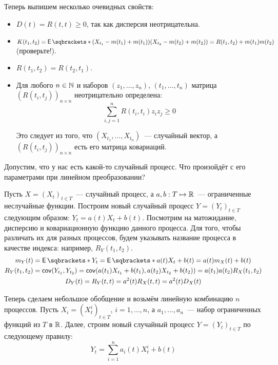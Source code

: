 Теперь выпишем несколько очевидных свойств:
\begin{itemize}
	\item \(D(t) = R(t, t) \geq 0\), так как дисперсия неотрицательна.
	\item \(K(t_{1}, t_{2}) = \E{(X_{t_{1}} - m(t_{1}) + m(t_{1}))(X_{t_{2}} - 
		m(t_{2}) + m(t_{2}))}  = R(t_{1}, t_{2}) + m(t_{1})m(t_{2})\) 
		(проверьте!).
	\item \(R(t_{1}, t_{2}) = R(t_{2}, t_{1})\).
	\item Для любого \(n \in \mathbb{N}\) и наборов \((z_{1}, \ldots, z_{n})\), 
	\((t_{1}, \dots, t_{n})\) матрица \((R(t_{i}, t_{j}))_{n \times n}\) 
	неотрицательно определена:
	\[
	\sum_{i, j = 1}^{n} R(t_{i}, t_{i})z_{i}z_{j} \geq 0
	\]
	
	Это следует из того, что \((X_{t_{1}}, \dots, X_{t_{n}})\)~--- случайный 
	вектор, а \((R(t_{i}, t_{j}))_{n \times n}\) есть его матрица ковариаций.
\end{itemize}

Допустим, что у нас есть какой-то случайный процесс. Что произойдёт с его 
параметрами при линейном преобразовании?

Пусть \(X = (X_{t})_{t \in T}\)~--- случайный процесс, а \(a, b : T \mapsto 
\mathbb{R}\)~--- ограниченные неслучайные функции. Построим новый случайный процесс \(Y 
= (Y_{t})_{t \in T}\) следующим образом: \(Y_t = a(t)X_{t} + b(t)\). Посмотрим 
на матожидание, дисперсию и ковариационную функцию данного процесса. Для того, 
чтобы различать их для разных процессов, будем указывать название процесса в 
качестве индекса: например, \(R_{Y}(t_{1}, t_{2})\).
\begin{gather*}
	m_{Y}(t) = \E{Y_{t}} = \E{a(t)X_{t} + b(t)} = a(t)m_{X}(t) + b(t) \\
	R_{Y}(t_{1}, t_{2}) = \cov(Y_{t_{1}}, Y_{t_{2}}) = \cov(a(t_{1})X_{t_{1}} + 
	b(t_{1}), a(t_{2})X_{t_{2}} + b(t_{2})) = a(t_{1})a(t_{2})R_{X}(t_{1}, 
	t_{2}) \\
	D_{Y}(t) = R_{Y}(t, t) = a^{2}(t)R_{X}(t, t) = a^{2}(t)D_{X}(t)
\end{gather*}

Теперь сделаем небольшое обобщение и возьмём линейную комбинацию \(n\) 
процессов. Пусть \(X_{i} = (X_{t}^{i})_{t \in T}\), \(i = 1, \dots, n\), а 
\(a_{1}, \dots, 
a_{n}\)~--- набор ограниченных функций из \(T\) в \(\mathbb{R}\). Далее, строим новый 
случайный процесс \(Y = (Y_{t})_{t \in T}\) по следующему правилу:
\[
Y_{t} = \sum_{i = 1}^{n} a_{i}(t)X_{t}^{i} + b(t)
\]

